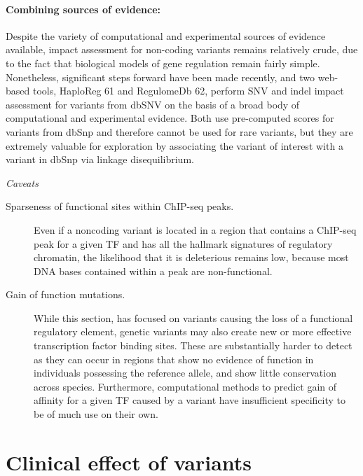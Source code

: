 \paragraph{Combining sources of evidence:} Despite the variety of computational and experimental sources of evidence available, impact assessment for non-coding variants remains relatively crude, due to the fact that biological models of gene regulation remain fairly simple. Nonetheless, significant steps forward have been made recently, and two web-based tools, HaploReg 61 and RegulomeDb 62, perform SNV and indel impact assessment for variants from dbSNV on the basis of a broad body of computational and experimental evidence. Both use pre-computed scores for variants from dbSnp and therefore cannot be used for rare variants, but they are extremely valuable for exploration by associating the variant of interest with a variant in dbSnp via linkage disequilibrium. 

\textit{Caveats}

	\begin{description}
	
	\item[Sparseness of functional sites within ChIP-seq peaks.] Even if a noncoding variant is located in a region that contains a ChIP-seq peak for a given TF and has all the hallmark signatures of regulatory chromatin, the likelihood that it is deleterious remains low, because most DNA bases contained within a peak are non-functional. 
	
	\item[Gain of function mutations.] While this section, has focused on variants causing the loss of a functional regulatory element, genetic variants may also create new or more effective transcription factor binding sites. These are substantially harder to detect as they can occur in regions that show no evidence of function in individuals possessing the reference allele, and show little conservation across species. Furthermore, computational methods to predict gain of affinity for a given TF caused by a variant have insufficient specificity to be of much use on their own. 
	
	\end{description}

\section{ Clinical effect of variants}

